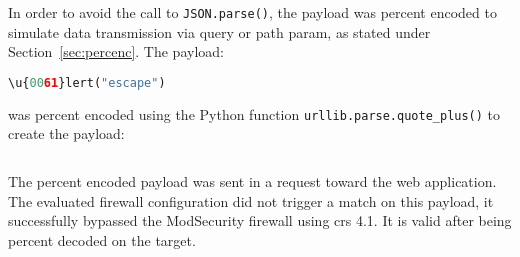 In order to avoid the call to \verb|JSON.parse()|, the payload was percent encoded to simulate data transmission via query or path param, as stated under Section~\ref{sec:percenc}. The payload:

\begin{lstlisting}[style=basicStyle, escapeinside=\^\^, language=Python]
\u{0061}lert("escape")
\end{lstlisting}

was percent encoded using the Python function \verb|urllib.parse.quote_plus()| to create the payload:

\begin{lstlisting}[style=basicStyle, escapeinside=\^\^, language=Python, caption=JS Character Escape + Percent Encoding bypass]
%5Cu%7B0061%7Dlert%28%27escape%27%29
\end{lstlisting}

The percent encoded payload was sent in a request toward the web application. The evaluated firewall configuration did not trigger a match on this payload, it successfully bypassed the ModSecurity firewall using \acrshort{crs} 4.1. It is valid after being percent decoded on the target.

%
%
%
%
%
%


